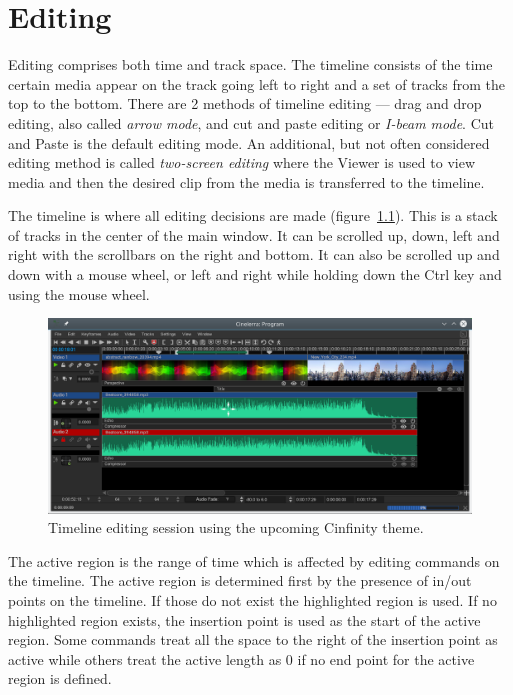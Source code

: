 \chapter{Editing}%
\label{cha:editing}

Editing comprises both time and track space.  The timeline consists of the time certain media appear on the track going left to right and a set of tracks from the top to the bottom.  There are 2 methods of timeline editing --- drag and drop editing, also called \textit{arrow mode}, and cut and paste editing or \textit{I-beam mode}.  Cut and Paste is the default editing mode.  An additional, but not often considered editing method is called \textit{two-screen editing} where the Viewer is used to view media and then the desired clip from the media is transferred to the timeline.

The timeline is where all editing decisions are made (figure~\ref{fig:timeline}).  This is a stack of tracks in the center of the main window.  It can be scrolled up, down, left and right with the scrollbars on the right and bottom.  It can also be scrolled up and down with a mouse wheel, or left and right while holding down the Ctrl key and using the mouse wheel.

\begin{figure}[htpb]
    \centering
    \includegraphics[width=0.8\linewidth]{images/timeline.png}
    \caption{Timeline editing session using the upcoming Cinfinity theme.}
    \label{fig:timeline}
\end{figure}

The active region is the range of time which is affected by editing commands on the timeline.  The active region is determined first by the presence of in/out points on the timeline.  If those do not exist the highlighted region is used.  If no highlighted region exists, the insertion point is used as the start of the active region.  Some commands treat all the space to the right of the insertion point as active while others treat the active length as 0 if no end point for the active region is defined.

